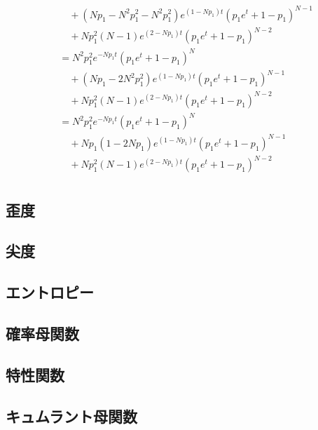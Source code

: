 \documentclass[dvipdfmx]{jsarticle}
\begin{document}
\begin{align}
  &\quad+\left(Np_1-N^2p_1^2-N^2p_1^2\right)e^{\left(1-Np_1\right)t}\left(p_1e^t+1-p_1\right)^{N-1}\nonumber\\
  &\quad+Np_1^2\left(N-1\right)e^{\left(2-Np_1\right)t}\left(p_1e^t+1-p_1\right)^{N-2}\nonumber\\
  &=N^2p_1^2e^{-Np_1t}\left(p_1e^t+1-p_1\right)^N\nonumber\\
  &\quad+\left(Np_1-2N^2p_1^2\right)e^{\left(1-Np_1\right)t}\left(p_1e^t+1-p_1\right)^{N-1}\nonumber\\
  &\quad+Np_1^2\left(N-1\right)e^{\left(2-Np_1\right)t}\left(p_1e^t+1-p_1\right)^{N-2}\nonumber\\
  &=N^2p_1^2e^{-Np_1t}\left(p_1e^t+1-p_1\right)^N\nonumber\\
  &\quad+Np_1\left(1-2Np_1\right)e^{\left(1-Np_1\right)t}\left(p_1e^t+1-p_1\right)^{N-1}\nonumber\\
  &\quad+Np_1^2\left(N-1\right)e^{\left(2-Np_1\right)t}\left(p_1e^t+1-p_1\right)^{N-2}\nonumber\\
 \end{align}
 \subsection{歪度}
 \subsection{尖度}
 \subsection{エントロピー}
 \subsection{確率母関数}
 \subsection{特性関数}
 \subsection{キュムラント母関数}
\end{document}
